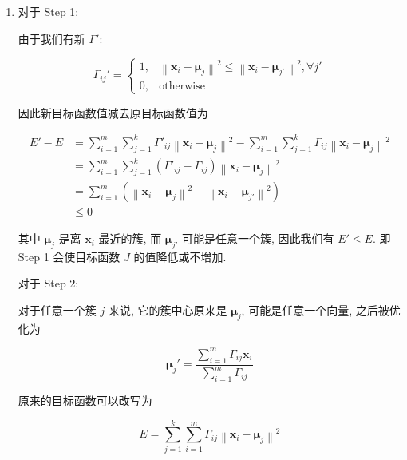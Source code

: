 \documentclass[answers]{exam}  %
\begin{document}
\begin{questions}
  \begin{solution}
    \begin{enumerate}
      \item

            对于 Step 1:

            由于我们有新 $\Gamma'$:

            $$
              \Gamma_{ij}' = \begin{cases}
                1, & \left\| \bm{x}_{i} - \bm{\mu}_{j} \right\|^{2} \le \left\| \bm{x}_{i} - \bm{\mu}_{j'} \right\|^{2}, \forall j' \\
                0, & \text{otherwise}
              \end{cases}
            $$

            因此新目标函数值减去原目标函数值为

            $$
              \begin{aligned}
                E' - E & = \sum_{i=1}^{m}\sum_{j=1}^{k}\Gamma'_{ij}\left\| \bm{x}_i - \bm{\mu}_j \right\|^{2} - \sum_{i=1}^{m}\sum_{j=1}^{k}\Gamma_{ij}\left\| \bm{x}_i - \bm{\mu}_j \right\|^{2} \\
                       & = \sum_{i=1}^{m}\sum_{j=1}^{k}(\Gamma'_{ij}-\Gamma_{ij})\left\| \bm{x}_i - \bm{\mu}_j \right\|^{2}                                                                       \\
                       & = \sum_{i=1}^{m}(\left\| \bm{x}_i - \bm{\mu}_j \right\|^{2} - \left\| \bm{x}_i - \bm{\mu}_{j'} \right\|^{2})                                                             \\
                       & \le 0
              \end{aligned}
            $$

            其中 $\bm{\mu}_j$ 是离 $\bm{x}_i$ 最近的簇, 而 $\bm{\mu}_{j'}$ 可能是任意一个簇, 因此我们有 $E' \le E$. 即 Step 1 会使目标函数 $J$ 的值降低或不增加.

            对于 Step 2:

            对于任意一个簇 $j$ 来说, 它的簇中心原来是 $\bm{\mu}_{j}$, 可能是任意一个向量, 之后被优化为

            $$
              \bm{\mu}_j' = \frac{\sum_{i=1}^{m}\Gamma_{ij}\bm{x}_i}{\sum_{i=1}^{m}\Gamma_{ij}}
            $$

            原来的目标函数可以改写为

            $$
              E = \sum_{j=1}^{k}\sum_{i=1}^{m}\Gamma_{ij}\left\| \bm{x}_i - \bm{\mu}_j \right\|^{2}
            $$


\end{enumerate}
\end{solution}
\end{questions}
\end{document}
